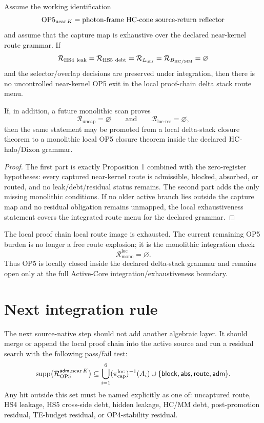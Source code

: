 \begin{theorem}
Assume the working identification
\[
\mathrm{OP5}_{\mathrm{near}\,K}=\text{photon-frame }\mathrm{HC}\text{-cone source-return reflector}
\]
and assume that the capture map is exhaustive over the declared near-kernel
route grammar. If
\[
\mathcal R_{\mathrm{HS4\ leak}}
=\mathcal R_{\mathrm{HS5\ debt}}
=\mathcal R_{L_{\mathrm{unr}}}
=\mathcal R_{B_{\mathrm{HC}/\mathrm{MM}}}
=\varnothing
\]
and the selector/overlap decisions are preserved under integration, then
there is no uncontrolled near-kernel OP5 exit in the local proof-chain delta stack route
menu.

If, in addition, a future monolithic scan proves
\[
\mathcal R_{\mathrm{uncap}}=\varnothing
\qquad\text{and}\qquad
\mathcal R_{\mathrm{loc\text{-}res}}=\varnothing,
\]
then the same statement may be promoted from a local delta-stack closure theorem
to a monolithic local OP5 closure theorem inside the declared
\(\mathrm{HC}\)-halo/Dixon grammar.
\end{theorem}

\begin{proof}
The first part is exactly Proposition 1 combined with the zero-register
hypotheses: every captured near-kernel route is admissible, blocked, absorbed,
or routed, and no leak/debt/residual status remains. The second part adds the
only missing monolithic conditions. If no older active branch lies outside the
capture map and no residual obligation remains unmapped, the local
exhaustiveness statement covers the integrated route menu for the
declared grammar.
\end{proof}

\begin{corollary}
The local proof chain local route image is exhausted. The current remaining OP5 burden
is no longer a free route explosion; it is the monolithic integration check
\[
\mathcal R_{\mathrm{mono}}^{\mathrm{loc}}=\varnothing.
\]
Thus OP5 is locally closed inside the declared delta-stack grammar and remains
open only at the full Active-Core integration/exhaustiveness boundary.
\end{corollary}

\section{Next integration rule}

The next source-native step should not add another algebraic layer. It should
merge or append the local proof chain into the active source and run a residual search with
the following pass/fail test:
\[
\operatorname{supp}\bigl(\mathcal R_{\mathrm{OP5}}^{\mathsf{adm},\mathrm{near}\,K}\bigr)
\subseteq
\bigcup_{i=1}^{6}(\pi_{\mathrm{cap}}^{\mathrm{loc}})^{-1}(A_i)
\cup
\{\mathsf{block},\mathsf{abs},\mathsf{route},\mathsf{adm}\}.
\]
Any hit outside this set must be named explicitly as one of: uncaptured route,
HS4 leakage, HS5 cross-side debt, hidden leakage, HC/MM debt, post-promotion
residual, TE-budget residual, or OP4-stability residual.

